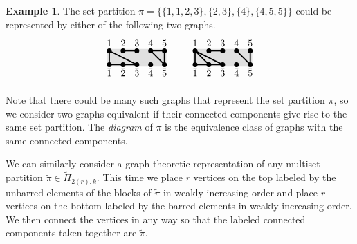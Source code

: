 \documentclass[10pt]{amsart}
\theoremstyle{definition}
\theoremstyle{definition}
\newtheorem{exam}[exam]{Example}
\theoremstyle{plain}
\theoremstyle{remark}
\theoremstyle{plain}
\theoremstyle{plain}
\newcommand{\tpi}{{\tilde{\pi}}}
\newcommand{\ov}[1]{\bar{#1}}
\newcommand{\defn}[1]{\textcolor{defncolor}{\emph{#1}}}
\newcommand{\colortop}[2]{\foreach \i in {#1}  {\filldraw[fill=#2,draw=#2,line width = 1pt] (T\i) circle (4pt);}}
\newcommand{\colorbot}[2]{\foreach \i in {#1}  {\filldraw[fill=#2,draw=#2,line width = 1pt] (B\i) circle (4pt);}}
\begin{document}
\begin{exam} The set partition $\pi=\{\{1,\ov1,\ov2,\ov3\},\{2,3\},\{\ov4\},\{4,5,\ov5\}\}$ could be represented by either of the following two graphs.
    \begin{align*}
        \begin{array}{c}
            \begin{tikzpicture}[xscale=.5,yscale=.5,line width=1.25pt] 
                \foreach \i in {1,2,3,4,5}  { \path (\i,1.25) coordinate (T\i); \path(\i,1.8) node {$\i$}; \path (\i,.25) coordinate (B\i); \path(\i,-.3) node {$\ov{\i}$}; } 
                \filldraw[fill= black!12,draw=black!12,line width=4pt]  (T1) -- (T5) -- (B5) -- (B1) -- (T1);
                \draw[black] (T1)--(B3)--(B2)--(B1)--(T1);
                \draw[black] (T2)--(T3);
                \draw[black] (T4)--(T5)--(B5)--(T4);
                \colortop{1,2,3,4,5}{black}
                \colorbot{1,2,3,4,5}{black}
            \end{tikzpicture}
        \end{array} && \begin{array}{c}
            \begin{tikzpicture}[xscale=.5,yscale=.5,line width=1.25pt] 
                \foreach \i in {1,2,3,4,5}  { \path (\i,1.25) coordinate (T\i); \path(\i,1.8) node {$\i$}; \path (\i,.25) coordinate (B\i); \path(\i,-.3) node {$\ov{\i}$}; } 
                \filldraw[fill= black!12,draw=black!12,line width=4pt]  (T1) -- (T5) -- (B5) -- (B1) -- (T1);
                \draw[black] (T1)--(B3)--(B2)--(B1)--(T1);
                \draw[black] (T1)--(B2);
                \draw[black] (T2)--(T3);
                \draw[black] (T5)--(B5)--(T4);
                \colortop{1,2,3,4,5}{black}
                \colorbot{1,2,3,4,5}{black}
            \end{tikzpicture}
        \end{array}
    \end{align*}
\end{exam}

Note that there could be many such graphs that represent the set partition $\pi$, so we consider two graphs equivalent if their connected components give rise to the same set partition. The \defn{diagram} of $\pi$ is the equivalence class of graphs with the same connected components.

We can similarly consider a graph-theoretic representation of any multiset partition $\tpi\in\tilde\Pi_{2(r),k}$. This time we place $r$ vertices on the top labeled by the unbarred elements of the blocks of $\tpi$ in weakly increasing order and place $r$ vertices on the bottom labeled by the barred elements in weakly increasing order. We then connect the vertices in any way so that the labeled connected components taken together are $\tpi$.
\end{document}
